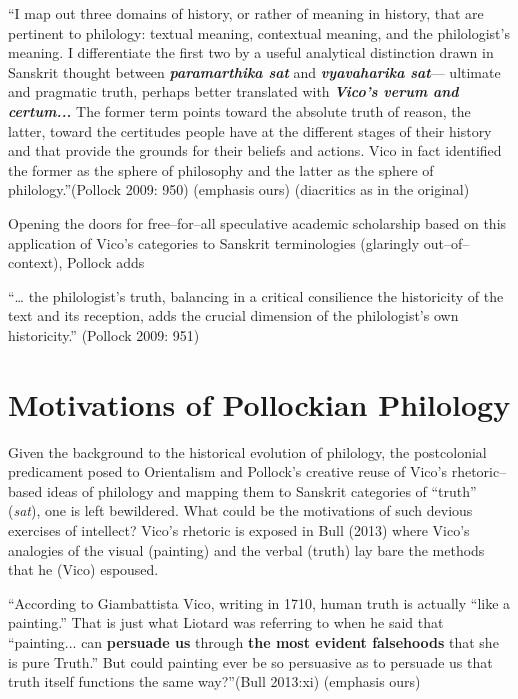\begin{myquote}
“I map out three domains of history, or rather of meaning in history, that are pertinent to philology: textual meaning, contextual meaning, and the philologist’s meaning. I differentiate the first two by a useful analytical distinction drawn in Sanskrit thought between \textbf{\textit{paramarthika sat}} and \textbf{\textit{vyavaharika sat}}— ultimate and pragmatic truth, perhaps better translated with \textbf{\textit{Vico’s verum and certum...}} The former term points toward the absolute truth of reason, the latter, toward the certitudes people have at the different stages of their history and that provide the grounds for their beliefs and actions. Vico in fact identified the former as the sphere of philosophy and the latter as the sphere of philology.”\hfill (Pollock 2009: 950) (emphasis ours) (diacritics as in the original)
\end{myquote}

Opening the doors for free–for–all speculative academic scholarship based on this application of Vico’s categories to Sanskrit terminologies (glaringly out–of–context), Pollock adds

\begin{myquote}
“… the philologist’s truth, balancing in a critical consilience the historicity of the text and its reception, adds the crucial dimension of the philologist’s own historicity.” (Pollock 2009: 951)
\end{myquote}


\section*{Motivations of Pollockian Philology}

Given the background to the historical evolution of philology, the postcolonial predicament posed to Orientalism and Pollock’s creative reuse of Vico’s rhetoric–based ideas of philology and mapping them to Sanskrit categories of “truth” (\textit{sat}), one is left bewildered. What could be the motivations of such devious exercises of intellect? Vico’s rhetoric is exposed in Bull (2013) where Vico’s analogies of the visual (painting) and the verbal (truth) lay bare the methods that he (Vico) espoused.

\begin{myquote}
“According to Giambattista Vico, writing in 1710, human truth is actually “like a painting.” That is just what Liotard was referring to when he said that “painting... can \textbf{persuade us} through \textbf{the most evident falsehoods} that she is pure Truth.” But could painting ever be so persuasive as to persuade us that truth itself functions the same way?”\hfill (Bull 2013:xi) (emphasis ours)
\end{myquote}

